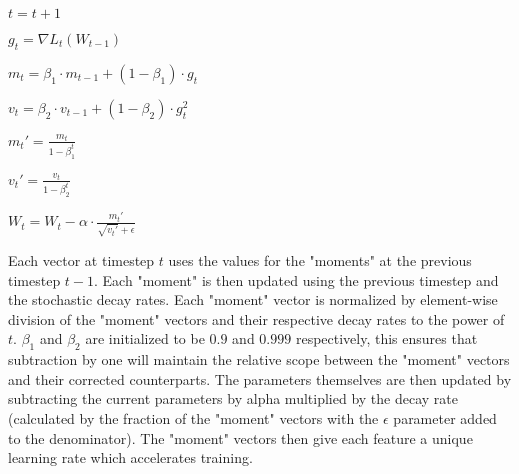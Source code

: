 \begin{center}


$t = t + 1$

$g_t = \nabla L_t(W_{t-1})$

$m_t = \beta_1 \cdot m_{t-1} + (1-\beta_1) \cdot g_t $

$v_t = \beta_2 \cdot v_{t-1} + (1-\beta_2) \cdot g_t^2 $

$m_t' = \frac{m_t}{1-\beta_1^t}$

$v_t' = \frac{v_t}{1-\beta_2^t}$

$W_t = W_t - \alpha \cdot \frac{m_t'}{\sqrt{v_t'} + \epsilon}$

\end{center}

Each vector at timestep $t$ uses the values for the "moments" at the previous timestep $t-1$. Each "moment" is then updated using the previous timestep and the stochastic decay rates. Each "moment" vector is normalized by element-wise division of the "moment" vectors and their respective decay rates to the power of $t$. $\beta_1$ and $\beta_2$ are initialized to be $0.9$ and $0.999$ respectively, this ensures that subtraction by one will maintain the relative scope between the "moment" vectors and their corrected counterparts. The parameters themselves are then updated by subtracting the current parameters by alpha multiplied by the decay rate (calculated by the fraction of the "moment" vectors with the $\epsilon$ parameter added to the denominator). The "moment" vectors then give each feature a unique learning rate which accelerates training.